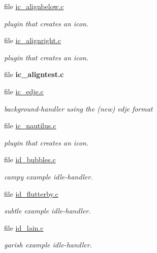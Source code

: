 \begin{CompactItemize}
\item 
file \hyperlink{ic__alignbelow_8c}{ic\_\-alignbelow.c}
\begin{CompactList}\small\item\em plugin that creates an icon. \item\end{CompactList}

\item 
file \hyperlink{ic__alignright_8c}{ic\_\-alignright.c}
\begin{CompactList}\small\item\em plugin that creates an icon. \item\end{CompactList}

\item 
file {\bf ic\_\-aligntest.c}
\item 
file \hyperlink{ic__edje_8c}{ic\_\-edje.c}
\begin{CompactList}\small\item\em background-handler using the (new) edje format \item\end{CompactList}

\item 
file \hyperlink{ic__nautilus_8c}{ic\_\-nautilus.c}
\begin{CompactList}\small\item\em plugin that creates an icon. \item\end{CompactList}

\item 
file \hyperlink{id__bubbles_8c}{id\_\-bubbles.c}
\begin{CompactList}\small\item\em campy example idle-handler. \item\end{CompactList}

\item 
file \hyperlink{id__flutterby_8c}{id\_\-flutterby.c}
\begin{CompactList}\small\item\em subtle example idle-handler. \item\end{CompactList}

\item 
file \hyperlink{id__lain_8c}{id\_\-lain.c}
\begin{CompactList}\small\item\em garish example idle-handler. \item\end{CompactList}


\end{CompactItemize}
